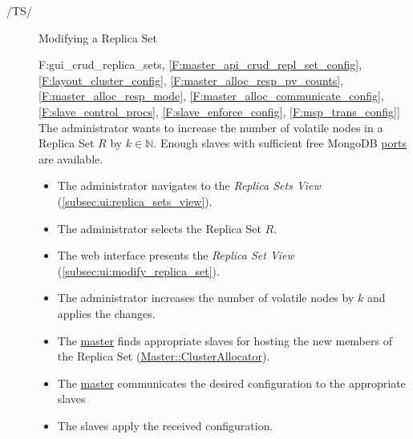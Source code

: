 \documentclass[a4paper, 11pt]{article}
\makeatletter
\def\namedlabel#1#2{\begingroup
    #2%
    \def\@currentlabel{#2}%
    \phantomsection\label{#1}\endgroup
}
\newcommand{\oitem}[2]{
  \@ifundefined{c@oitem#1}{\newcounter{oitem#1}}{} %
  \addtocounter{oitem#1}{10}
  \item[\namedlabel{#1:#2}{/#1\arabic{oitem#1}/}]
}
\newcommand{\testsequence}[3][]{
	\begin{description}[leftmargin=!,labelwidth=\widthof{\bfseries Preconditions}]
		\ifthenelse{\equal{#1}{}}
		{} %
		{\item[Tests] #1}
		\item[Preconditions] #2
		\item[Steps] #3
	\end{description}
}
\makeatother
\begin{document}
\begin{description}
\oitem{TS}{} Modifying a Replica Set
\testsequence
[\ref{F:gui_crud_replica_sets}, \ref{F:master_api_crud_repl_set_config}, \ref{F:layout_cluster_config}, \ref{F:master_alloc_resp_pv_counts}, \ref{F:master_alloc_resp_mode}, \ref{F:master_alloc_communicate_config}, \ref{F:slave_control_procs}, \ref{F:slave_enforce_config}, \ref{F:msp_trans_config}]
{
	The \gls{administrator} wants to increase the number of volatile nodes in a Replica Set $R$ by $k \in \mathbb{N}$. Enough \glspl{slave} with sufficient free \gls{MongoDB} \hyperref[D:slave_mongod_portrange]{ports} are available.
}
{
	\begin{itemize}
		\item The \gls{administrator} navigates to the \textit{Replica Sets View} (\ref{subsec:ui:replica_sets_view}).
		\item The \gls{administrator} selects the Replica Set $R$.
		\item The web interface presents the \textit{Replica Set View} (\ref{subsec:ui:modify_replica_set}).
		\item The \gls{administrator} increases the number of volatile nodes by $k$ and applies the changes.
		\item The \hyperref[SM:Master]{master} finds appropriate \glspl{slave} for hosting the new members of the Replica Set (\hyperref[SM:master_clusterallocator]{Master::ClusterAllocator}).
		\item The \hyperref[SM:Master]{master} communicates the desired configuration to the appropriate \glspl{slave}
		\item The \glspl{slave} apply the received configuration.
	\end{itemize}
}



\end{description}
\end{document}
